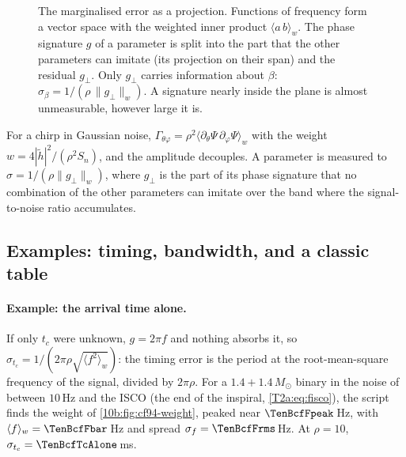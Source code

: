 \begin{figure}[htbp]
\centering
{}
\caption{The marginalised error as a projection. Functions of frequency form a vector space with the weighted inner
product $\langle a\,b\rangle_w$. The phase signature $g$ of a parameter is split into the part that the other
parameters can imitate (its projection on their span) and the residual $g_\perp$. Only $g_\perp$ carries
information about $\beta$: $\sigma_\beta=1/(\rho\,\|g_\perp\|_w)$. A signature nearly inside the plane is almost
unmeasurable, however large it is.}
\label{10b:fig:projection}
\end{figure}

\begin{keyidea}
For a chirp in Gaussian noise, $\Gamma_{\theta\varphi}=\rho^2\langle\partial_\theta\Psi\,\partial_\varphi\Psi\rangle_w$
with the weight $w=4|\tilde h|^2/(\rho^2S_n)$, and the amplitude decouples. A parameter is measured to
$\sigma=1/(\rho\|g_\perp\|_w)$, where $g_\perp$ is the part of its phase signature that no combination of the other
parameters can imitate over the band where the signal-to-noise ratio accumulates.
\end{keyidea}

\subsection{Examples: timing, bandwidth, and a classic table}
\label{10b:sec:fisher-examples}

\paragraph{Example: the arrival time alone.} If only $t_c$ were unknown, $g=2\pi f$ and nothing absorbs it, so
$\sigma_{t_c}=1/(2\pi\rho\sqrt{\langle f^2\rangle_w})$: the timing error is the period at the root-mean-square
frequency of the signal, divided by $2\pi\rho$. For a $1.4+1.4\,M_\odot$ binary in the noise of
\cite[eq.~(4)]{CutlerFlanagan1994} between $10$\,Hz and the ISCO (the end of the inspiral, \cref{T2a:eq:fisco}), the script  finds the weight of
\cref{10b:fig:cf94-weight}, peaked near $\TenBcfFpeak$\,Hz, with $\langle f\rangle_w=\TenBcfFbar$\,Hz and spread
$\sigma_f=\TenBcfFrms$\,Hz. At $\rho=10$, $\sigma_{t_c}=\TenBcfTcAlone$\,ms.


